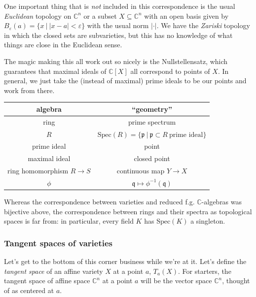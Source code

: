 \documentclass{amsart}[12pt]
\newcommand{\Spec}{\mathrm{Spec}}
\newcommand{\C}{\mathbb{C}}
\newcommand{\fp}{{\mathfrak p}}
\newcommand{\fq}{{\mathfrak q}}
\numberwithin{equation}{section}
\theoremstyle{plain} %
\theoremstyle{definition}
\theoremstyle{remark}
\newcommand{\sssec}[1]{\subsubsection{#1}}
\begin{document}
One important thing that is \emph{not} included in this correspondence is the usual \emph{Euclidean} topology on $\C^n$ or a subset $X\subseteq \C^n$ with an open basis given by $B_\varepsilon(a) = \{ x \ | \ |x-a|<\varepsilon\}$ with the usual norm $|\cdot |$. We have the \emph{Zariski} topology in which the closed sets are subvarieties, but this has no knowledge of what things are close in the Euclidean sense. 

The magic making this all work out so nicely is the Nullstellensatz, which guarantees that maximal ideals of $\C[X]$ all correspond to points of $X$. In general, we just take the (instead of maximal) prime ideals to be our points and work from there.




\begin{center}
\begin{tabular}{c|c}
algebra & ``geometry'' \\ \hline \hline
ring & prime spectrum \\ \hline
 $R$ & $\Spec(R)=\{\fp \ | \ \fp\subset R \ \text{prime ideal}\}$ \\ \hline
prime ideal & point \\ \hline
maximal ideal & closed point \\ \hline
ring homomorphism $R\to S$  & continuous map $Y\to X$ \\
$\phi$ & $\fq \mapsto \phi^{-1}(\fq)$
\end{tabular}
\end{center}

Whereas the correspondence between varieties and reduced f.g. $\C$-algebras was bijective above, the correspondence between rings and their spectra as topological spaces is far from: in particular, every field $K$ has $\Spec(K)$ a singleton. 


\newpage

\sssec{Tangent spaces of varieties}

Let's get to the bottom of this corner business while we're at it. Let's define the \emph{tangent space} of an affine variety $X$ at a point $a$, $T_{a}(X)$. For starters, the tangent space of affine space $\C^n$ at a point $a$ will be the vector space $\C^n$, thought of as centered at $a$. 
\end{document}
